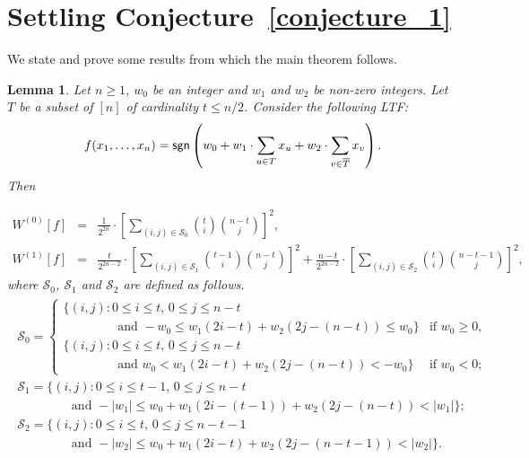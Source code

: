 \documentclass[11pt]{article}
\newtheorem{lemma} {Lemma}
\newcommand{\sym}[1]{{\sf #1}}
\begin{document}
\section{Settling Conjecture~\ref{conjecture_1} \label{sec-conj1}}
We state and prove some results from which the main theorem follows.

\begin{lemma}\label{lemma_n_odd}
	Let $n\geq 1$, $w_0$ be an integer and $w_1$ and $w_2$ be non-zero integers. Let $T$ be a subset of $[n]$ of cardinality $t\leq n/2$.
	Consider the following LTF: $$f(x_1,\ldots,x_n)=\sym{sgn}\left(w_0+w_1\cdot\sum_{u\in T}x_{u}+w_2\cdot\sum_{v\in \overline{T}}x_{v}\right).$$ Then

\begin{eqnarray}
    	{W}^{(0)}[f] 
	& = & \frac{1}{2^{2n}} \cdot \left[\sum_{(i,j)\in \mathcal{S}_0}{t \choose i}{n-t\choose j}\right]^2, \label{eq_n_odd0} \\
	{W}^{(1)}[f] 
	& = & \frac{t}{2^{2n-2}} \cdot \left[\sum_{(i,j)\in \mathcal{S}_1}{t-1 \choose i}{n-t\choose j}\right]^2 
			+ \frac{n-t}{2^{2n-2}} \cdot \left[\sum_{(i,j)\in \mathcal{S}_2}{t \choose i}{n-t-1\choose j}\right]^2, \label{eq_n_odd1} 
\end{eqnarray}
where $\mathcal{S}_{0}$,  $\mathcal{S}_{1}$ and $\mathcal{S}_{2}$ are defined as follows.
\begin{eqnarray*}
	\begin{array}{l}
		\mathcal{S}_{0}=
		\left\{
			\begin{array}{ll}
				\{(i,j): 0\leq i \leq t \text{, } 0\leq j \leq n-t \\
				\qquad\qquad \text{ and } -w_0\leq w_1(2i-t)+w_2(2j-(n-t)) \leq w_0\} & \text{if } w_0\geq 0, \\
				\{(i,j): 0\leq i \leq t \text{, } 0\leq j \leq n-t \\
				\qquad \qquad \text{ and } w_0< w_1(2i-t)+w_2(2j-(n-t)) < -w_0\} & \text{if } w_0<0;
			\end{array}

		\right. \\
		\mathcal{S}_{1} = \{(i,j): 0\leq i \leq t-1 \text{, } 0\leq j \leq n-t \\ 
		\qquad\qquad \text{ and } -|w_1|\leq w_0+w_1(2i-(t-1))+w_2(2j-(n-t))<|w_1|\}; \\
		\mathcal{S}_{2} = \{(i,j): 0\leq i \leq t \text{, } 0\leq j \leq n-t-1 \\
		\qquad \qquad \text{ and } -|w_2|\leq w_0+w_1(2i-t)+w_2(2j-(n-t-1)) < |w_2|\}.
	\end{array}
\end{eqnarray*}
	

\end{lemma}
\end{document}
